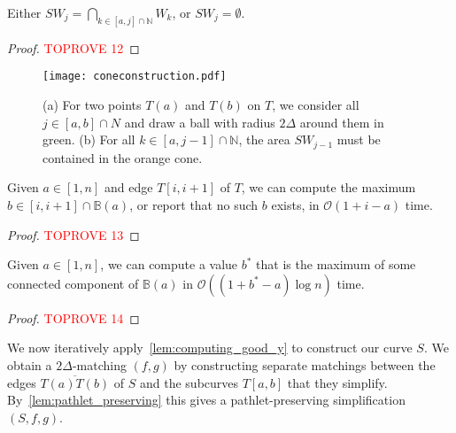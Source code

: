 \documentclass[a4paper,UKenglish,cleveref,thm-restate,notab]{lipics-v2021}
\newcommand{\bigO}{\mathcal{O}}
\newcommand{\N}{\mathbb{N}}
\newcommand{\B}{\mathbb{B}}
\newcommand{\SW}{\mathit{SW}}
\begin{document}
    \begin{lemma}
        \label{lem:intersection}
        Either $\SW_j = \bigcap_{ k \in [a, j] \cap \N } W_k$, or $\SW_j = \emptyset$.
    \end{lemma}
    \begin{proof}\textcolor{red}{TOPROVE 12}\end{proof}
    
    \begin{figure}
        \centering
        \texttt{[image: coneconstruction.pdf]}
        \caption{(a) For two points $T(a)$ and $T(b)$ on $T$, we consider all $j \in [a, b] \cap N$ and draw a ball with radius $2\Delta$ around them in green. 
        (b) For all $k \in [a, j-1] \cap \N$, the area $\SW_{j-1}$ must be contained in the orange cone. }
        \label{fig:coneconstruction}
    \end{figure}
    
    \begin{lemma}
        \label{lem:maximum_of_edge}
        Given $a \in [1, n]$ and edge $T[i, i+1]$ of $T$, we can compute the maximum $b \in [i, i+1] \cap \B(a)$, or report that no such $b$ exists, in $\bigO(1+i-a)$ time.
    \end{lemma}
    \begin{proof}\textcolor{red}{TOPROVE 13}\end{proof}
    
    \begin{lemma}
        \label{lem:computing_good_y}
        Given $a \in [1, n]$, we can compute a value $b^*$ that is the maximum of some connected component of $\B(a)$ in $\bigO((1+b^*-a) \log n)$ time.
    \end{lemma}
    \begin{proof}\textcolor{red}{TOPROVE 14}\end{proof}
    
    We now iteratively apply~\cref{lem:computing_good_y} to construct our curve $S$.
    We obtain a $2\Delta$-matching $(f, g)$ by constructing separate matchings between the edges $\overline{T(a) T(b)}$ of $S$ and the subcurves $T[a, b]$ that they simplify.
    By~\cref{lem:pathlet_preserving} this gives a pathlet-preserving simplification $(S, f, g)$.

    \thmSimplification*

    
\end{document}
